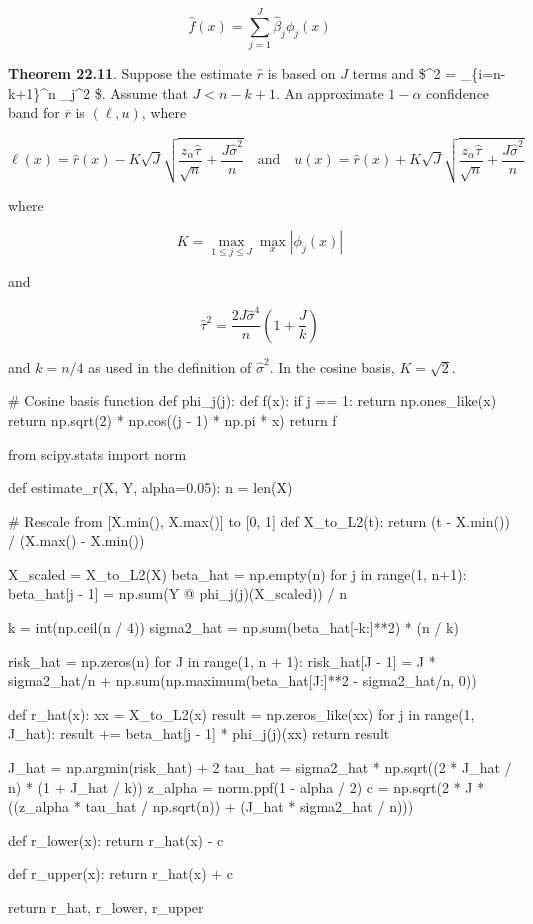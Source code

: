 \[ \hat{f}(x) = \sum_{j=1}^J \hat{\beta}_j \phi_j(x) \]

\textbf{Theorem 22.11}. Suppose the estimate \(\hat{r}\) is based on
\(J\) terms and \$\hat{\sigma}\^{}2 =  \sum\_\{i=n-k+1\}\^{}n
\hat{\beta}\_j\^{}2 \$. Assume that \(J < n - k + 1\). An approximate
\(1 - \alpha\) confidence band for \(\overline{r}\) is \((\ell, u)\),
where

\[ \ell(x) = \hat{r}(x) - K \sqrt{J} \sqrt{\frac{z_{\alpha} \hat{\tau}}{\sqrt{n}} + \frac{J \hat{\sigma}^2}{n}}
\quad \text{and} \quad u(x) = \hat{r}(x) + K \sqrt{J} \sqrt{\frac{z_{\alpha} \hat{\tau}}{\sqrt{n}} + \frac{J \hat{\sigma}^2}{n}} \]

where

\[ K = \max_{1 \leq j \leq J} \max_x | \phi_j(x) | \]

and

\[ \hat{\tau}^2 = \frac{2 J \hat{\sigma}^4}{n} \left( 1 + \frac{J}{k} \right) \]

and \(k = n / 4\) as used in the definition of \(\hat{\sigma}^2\). In
the cosine basis, \(K = \sqrt{2}\).

\begin{python}
# Cosine basis function
def phi_j(j):
    def f(x):
        if j == 1:
            return np.ones_like(x)
        return np.sqrt(2) * np.cos((j - 1) * np.pi * x)
    return f
\end{python}

\begin{python}
from scipy.stats import norm

def estimate_r(X, Y, alpha=0.05):
    n = len(X)

    # Rescale from [X.min(), X.max()] to [0, 1]
    def X_to_L2(t):
        return (t - X.min()) / (X.max() - X.min())
    
    X_scaled = X_to_L2(X)
    beta_hat = np.empty(n)
    for j in range(1, n+1):
        beta_hat[j - 1] = np.sum(Y @ phi_j(j)(X_scaled)) / n
        
    k = int(np.ceil(n / 4))
    sigma2_hat = np.sum(beta_hat[-k:]**2) * (n / k)

    risk_hat = np.zeros(n)
    for J in range(1, n + 1):
        risk_hat[J - 1] = J * sigma2_hat/n + np.sum(np.maximum(beta_hat[J:]**2 - sigma2_hat/n, 0))

    def r_hat(x):
        xx = X_to_L2(x)
        result = np.zeros_like(xx)
        for j in range(1, J_hat):
            result += beta_hat[j - 1] * phi_j(j)(xx)
        return result
        
    J_hat = np.argmin(risk_hat) + 2
    tau_hat = sigma2_hat * np.sqrt((2 * J_hat / n) * (1 + J_hat / k))
    z_alpha = norm.ppf(1 - alpha / 2)
    c = np.sqrt(2 * J * ((z_alpha * tau_hat / np.sqrt(n)) + (J_hat * sigma2_hat / n)))
    
    def r_lower(x):
        return r_hat(x) - c
    
    def r_upper(x):
        return r_hat(x) + c
            
    return r_hat, r_lower, r_upper
\end{python}


